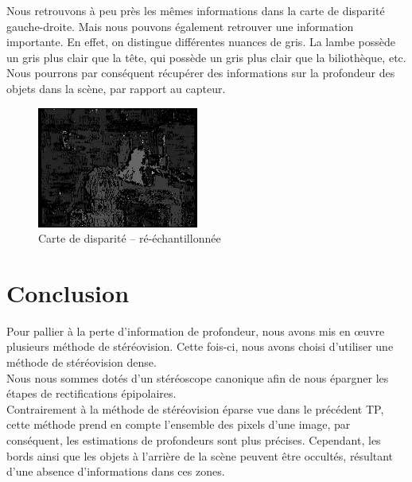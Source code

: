 \documentclass[a4paper]{article}
\begin{document}
Nous retrouvons à peu près les mêmes informations dans la carte de disparité gauche-droite. Mais nous pouvons également retrouver une information importante. En effet, on distingue différentes nuances de gris. La lambe possède un gris plus clair que la tête, qui possède un gris plus clair que la biliothèque, etc.
Nous pourrons par conséquent récupérer des informations sur la profondeur des objets dans la scène, par rapport au capteur.

\begin{figure}[h]
\begin{center}
	\includegraphics[width=200px]{disparity_resampled.png}
\end{center}
\caption{Carte de disparité -- ré-échantillonnée}
\end{figure}

\clearpage


\section{Conclusion}
Pour pallier à la perte d'information de profondeur, nous avons mis en œuvre plusieurs méthode de stéréovision. Cette fois-ci, nous avons choisi d'utiliser une méthode de stéréovision dense.\\
Nous nous sommes dotés d'un stéréoscope canonique afin de nous épargner les étapes de rectifications épipolaires.\\

Contrairement à la méthode de stéréovision éparse vue dans le précédent TP, cette méthode prend en compte l'ensemble des pixels d'une image, par conséquent, les estimations de profondeurs sont plus précises. Cependant, les bords ainsi que les objets à l'arrière de la scène peuvent être occultés, résultant d'une absence d'informations dans ces zones.\\
\end{document}
